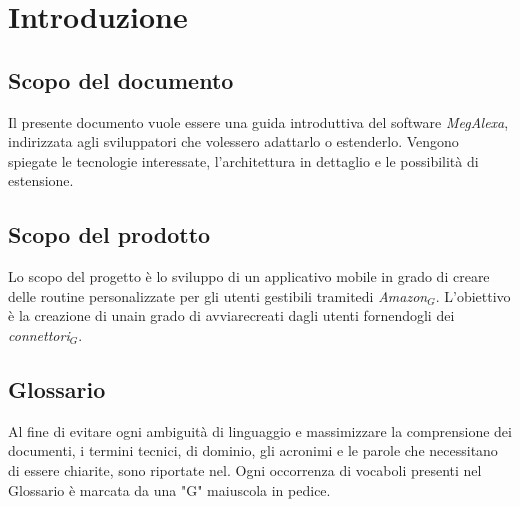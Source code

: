 \chapter{Introduzione}
\label{Introduzione}
\section{Scopo del documento}
Il presente documento vuole essere una guida introduttiva del software \textit{MegAlexa}, indirizzata agli sviluppatori che volessero adattarlo o estenderlo. Vengono spiegate le tecnologie interessate, l'architettura in dettaglio e le possibilità di estensione. 

\section{Scopo del prodotto}
Lo scopo del progetto è lo sviluppo di un applicativo mobile in grado di creare delle routine personalizzate per gli utenti 
gestibili tramitedi \textit{Amazon$_{G}$}. L’obiettivo è la creazione di unain grado di avviarecreati dagli utenti fornendogli dei \textit{connettori$_{G}$}.

\section{Glossario}
Al fine di evitare ogni ambiguità di linguaggio e massimizzare la comprensione dei documenti, i termini tecnici, di dominio, gli acronimi e le parole che necessitano di essere chiarite, sono riportate nel\glossariodocumento.
Ogni occorrenza di vocaboli presenti nel Glossario è marcata da una "G" maiuscola in pedice.


